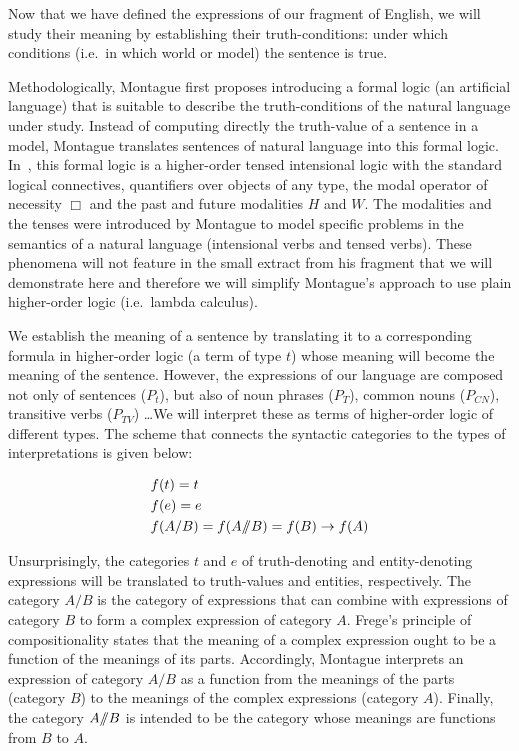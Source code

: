 Now that we have defined the expressions of our fragment of English, we
will study their meaning by establishing their truth-conditions: under
which conditions (i.e.\ in which world or model) the sentence is true.

Methodologically, Montague first proposes introducing a formal logic (an
artificial language) that is suitable to describe the truth-conditions of
the natural language under study. Instead of computing directly the
truth-value of a sentence in a model, Montague translates sentences of
natural language into this formal logic. In~\cite{montague1973proper}, this
formal logic is a higher-order tensed intensional logic with the standard
logical connectives, quantifiers over objects of any type, the modal
operator of necessity $\Box$ and the past and future modalities $H$ and
$W$. The modalities and the tenses were introduced by Montague to model
specific problems in the semantics of a natural language (intensional verbs
and tensed verbs). These phenomena will not feature in the small extract
from his fragment that we will demonstrate here and therefore we will
simplify Montague's approach to use plain higher-order logic (i.e.\ lambda
calculus).

We establish the meaning of a sentence by translating it to a corresponding
formula in higher-order logic (a term of type $t$) whose meaning will
become the meaning of the sentence. However, the expressions of our
language are composed not only of sentences ($P_t$), but also of noun
phrases ($P_T$), common nouns ($P_{CN}$), transitive verbs ($P_{TV}$)
\ldots We will interpret these as terms of higher-order logic of different
types. The scheme that connects the syntactic categories to the types of
interpretations is given below:

\begin{align*}
  &f(t) = t \\
  &f(e) = e \\
  &f(A / B) = f(A /\!\!/ B) = f(B) \to f(A)
\end{align*}

Unsurprisingly, the categories $t$ and $e$ of truth-denoting and
entity-denoting expressions will be translated to truth-values and
entities, respectively. The category $A / B$ is the category of expressions
that can combine with expressions of category $B$ to form a complex
expression of category $A$. Frege's principle of compositionality states
that the meaning of a complex expression ought to be a function of the
meanings of its parts. Accordingly, Montague interprets an expression of
category $A / B$ as a function from the meanings of the parts (category
$B$) to the meanings of the complex expressions (category $A$). Finally,
the category $A /\!\!/ B$ is intended to be the category whose
meanings are functions from $B$ to $A$.

